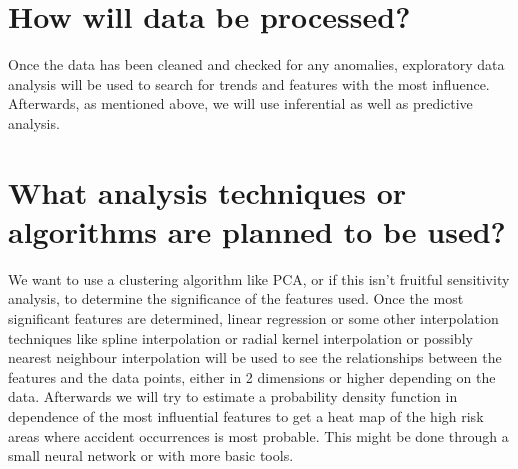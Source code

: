 \documentclass{article}
\begin{document}
\section*{How will data be processed?}
Once the data has been cleaned and checked for any anomalies, exploratory data analysis will be used to search for trends and features with the most influence. Afterwards, as mentioned above, we will use inferential as well as predictive analysis. 

\section*{What analysis techniques or algorithms are planned to be used?}
We want to use a clustering algorithm like PCA, or if this isn't fruitful sensitivity analysis, to determine the significance of the features used. Once the most significant features are determined, linear regression or some other interpolation techniques like spline interpolation or radial kernel interpolation or possibly nearest neighbour interpolation will be used to see the relationships between the features and the data points, either in 2 dimensions or higher depending on the data. Afterwards we will try to estimate a probability density function in dependence of the most influential features to get a heat map of the high risk areas where accident occurrences is most probable. This might be done through a small neural network or with more basic tools.
\end{document}
